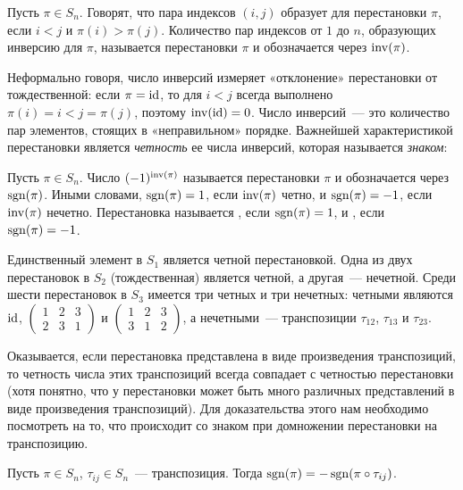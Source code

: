 \begin{definition}
Пусть $\pi\in S_n$. Говорят, что пара индексов $(i,j)$ образует
 для перестановки $\pi$, если $i<j$ и
$\pi(i)>\pi(j)$. Количество пар индексов от $1$ до $n$, образующих
инверсию для $\pi$, называется  перестановки
$\pi$ и обозначается через $\operatorname{inv}(\pi)$.
\end{definition}
Неформально говоря, число инверсий измеряет «отклонение» перестановки
от тождественной: если $\pi=\operatorname{id}$, то для $i<j$ всегда выполнено
$\pi(i)=i<j=\pi(j)$, поэтому $\operatorname{inv}(\operatorname{id})=0$. Число инверсий~--- это
количество пар элементов, стоящих в «неправильном» порядке.
Важнейшей характеристикой перестановки является {\it четность} ее
числа инверсий, которая называется {\it знаком}:
\begin{definition}\label{def:permutation_sign}
Пусть $\pi\in S_n$. Число $(-1)^{\operatorname{inv}(\pi)}$ называется
перестановки $\pi$ и обозначается через $\operatorname{sgn}(\pi)$. Иными словами,
$\operatorname{sgn}(\pi)=1$, если $\operatorname{inv}(\pi)$ четно, и $\operatorname{sgn}(\pi)=-1$, если
$\operatorname{inv}(\pi)$ нечетно. Перестановка называется , если
$\operatorname{sgn}(\pi)=1$, и , если $\operatorname{sgn}(\pi)=-1$.
\end{definition}
\begin{example}
Единственный элемент в $S_1$ является четной перестановкой.
Одна из двух перестановок в $S_2$ (тождественная) является четной, а
другая~--- нечетной. Среди шести перестановок в $S_3$ имеется три
четных и три нечетных: четными являются $\operatorname{id}$,
$\begin{pmatrix}1&2&3\\2&3&1\end{pmatrix}$ и
$\begin{pmatrix}1&2&3\\3&1&2\end{pmatrix}$, а нечетными~---
транспозиции $\tau_{12}$, $\tau_{13}$ и $\tau_{23}$.
\end{example}
Оказывается, если перестановка представлена в виде произведения
транспозиций, то четность числа этих транспозиций всегда совпадает с
четностью перестановки (хотя понятно, что у перестановки может быть
много различных представлений в виде произведения транспозиций).
Для доказательства этого нам необходимо посмотреть на то, что
происходит со знаком при домножении перестановки на
транспозицию.
\begin{proposition}\label{prop_transposition_changes_sign}
Пусть $\pi\in S_n$, $\tau_{ij}\in S_n$~--- транспозиция. Тогда
$\operatorname{sgn}(\pi)=-\operatorname{sgn}(\pi\circ\tau_{ij})$.
\end{proposition}
